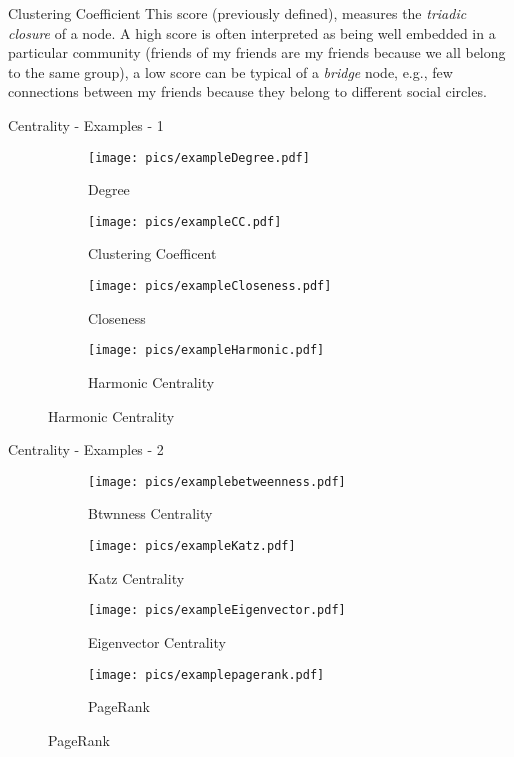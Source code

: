 \begin{textbox}{Clustering Coefficient}
    This score (previously defined), measures the \textit{triadic closure} of a node. A high score is often interpreted as being well embedded in a particular community (friends of my friends are my friends because we all belong to the same group), a low score can be typical of a \textit{bridge} node, e.g., few connections between my friends because they belong to different social circles.
\end{textbox}


\begin{textbox}{Centrality - Examples - 1}
    \begin{figure}[H]
        \begin{subfigure}{.5\textwidth}
            \texttt{[image: pics/exampleDegree.pdf]}
            \caption{Degree}
        \end{subfigure}
        \begin{subfigure}{.5\textwidth}
            \texttt{[image: pics/exampleCC.pdf]}
            \caption{Clustering Coefficent}
        \end{subfigure}

        \begin{subfigure}{.5\textwidth}
            \texttt{[image: pics/exampleCloseness.pdf]}
            \caption{Closeness}
        \end{subfigure}
        \begin{subfigure}{.5\textwidth}
            \texttt{[image: pics/exampleHarmonic.pdf]}
            \caption{Harmonic Centrality}
        \end{subfigure}
    \end{figure}
\end{textbox}


\begin{textbox}{Centrality - Examples - 2}
    \begin{figure}[H]
        \begin{subfigure}{.5\textwidth}
            \texttt{[image: pics/examplebetweenness.pdf]}
            \caption{Btwnness Centrality}
        \end{subfigure}
        \begin{subfigure}{.5\textwidth}
            \texttt{[image: pics/exampleKatz.pdf]}
            \caption{Katz Centrality}
        \end{subfigure}

        \begin{subfigure}{.5\textwidth}
            \texttt{[image: pics/exampleEigenvector.pdf]}
            \caption{Eigenvector Centrality}
        \end{subfigure}
        \begin{subfigure}{.5\textwidth}
            \texttt{[image: pics/examplepagerank.pdf]}
            \caption{PageRank}
        \end{subfigure}
    \end{figure}
\end{textbox}


